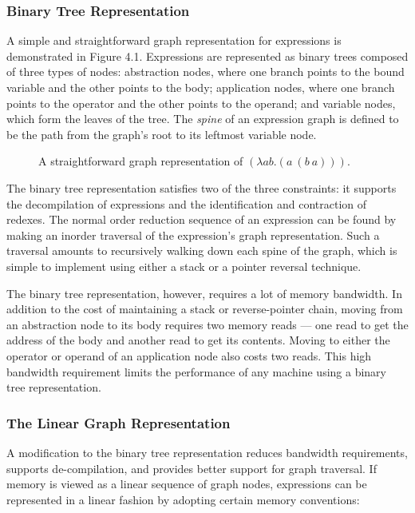\subsubsection*{Binary Tree Representation}

A simple and straightforward graph representation for expressions is demonstrated in Figure 4.1. Expressions are represented as binary trees composed of three types of nodes: abstraction nodes, where one branch points to the bound variable and the other points to the body; application nodes, where one branch points to the operator and the other points to the operand; and variable nodes, which form the leaves of the tree. The \emph{spine} of an expression graph is defined to be the path from the graph's root to its leftmost variable node.


\begin{figure}[htbp]
\centering

\caption[Binary tree graph representation]{A straightforward graph representation of \((\lambda ab.(a\ (b\ a)))\).}
\end{figure}

The binary tree representation satisfies two of the three constraints: it supports the decompilation of expressions and the identification and contraction of redexes. The normal order reduction sequence of an expression can be found by making an inorder traversal of the expression's graph representation. Such a traversal amounts to recursively walking down each spine of the graph, which is simple to implement using either a stack or a pointer reversal technique.

The binary tree representation, however, requires a lot of memory bandwidth. In addition to the cost of maintaining a stack or reverse-pointer chain, moving from an abstraction node to its body requires two memory reads --- one read to get the address of the body and another read to get its contents. Moving to either the operator or operand of an application node also costs two reads. This high bandwidth requirement limits the performance of any machine using a binary tree representation.

\subsubsection*{The Linear Graph Representation}

A modification to the binary tree representation reduces bandwidth requirements, supports de-compilation, and provides better support for graph traversal. If memory is viewed as a linear sequence of graph nodes, expressions can be represented in a linear fashion by adopting certain memory conventions:

